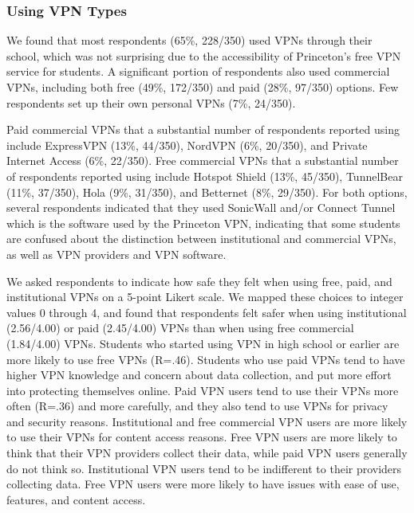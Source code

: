 
\subsubsection{Using VPN Types}

We found that most respondents (65\%, 228/350) used VPNs through their school,
which was not surprising due to the accessibility of Princeton’s free VPN
service for students. A significant portion of respondents also used
commercial VPNs, including both free (49\%, 172/350) and paid (28\%, 97/350)
options. Few respondents set up their own personal VPNs (7\%, 24/350).

Paid commercial VPNs that a substantial number of respondents reported using
include ExpressVPN (13\%, 44/350), NordVPN (6\%, 20/350), and Private Internet
Access (6\%, 22/350). Free commercial VPNs that a substantial number of
respondents reported using include Hotspot Shield (13\%, 45/350), TunnelBear
(11\%, 37/350), Hola (9\%, 31/350), and Betternet (8\%, 29/350). For both
options, several respondents indicated that they used SonicWall and/or Connect
Tunnel which is the software used by the Princeton VPN, indicating that some
students are confused about the distinction between institutional and
commercial VPNs, as well as VPN providers and VPN software.

We asked respondents to indicate how safe they felt when using free, paid, and
institutional VPNs on a 5-point Likert scale. We mapped these choices to
integer values 0 through 4, and found that respondents felt safer when using
institutional (2.56/4.00) or paid (2.45/4.00) VPNs than when using free
commercial (1.84/4.00) VPNs. Students who started using VPN in high school or
earlier are more likely to use free VPNs (R=.46). Students who use paid VPNs
tend to have higher VPN knowledge and concern about data collection, and put
more effort into protecting themselves online. Paid VPN users tend to use
their VPNs more often (R=.36) and more carefully, and they also tend to use
VPNs for privacy and security reasons. Institutional and free commercial VPN
users are more likely to use their VPNs for content access reasons. Free VPN
users are more likely to think that their VPN providers collect their data,
while paid VPN users generally do not think so. Institutional VPN users tend
to be indifferent to their providers collecting data. Free VPN users were more
likely to have issues with ease of use, features, and content access.

